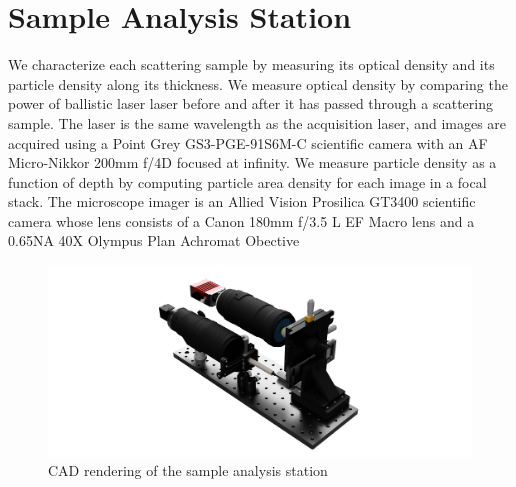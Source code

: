 \section{Sample Analysis Station}
We characterize each scattering sample by measuring its optical density and its particle density along its thickness. We measure optical density by comparing the power of ballistic laser laser before and after it has passed through a scattering sample. The laser is the same wavelength as the acquisition laser, and images are acquired using a Point Grey GS3-PGE-91S6M-C scientific camera with an AF Micro-Nikkor 200mm f/4D focused at infinity. We measure particle density as a function of depth by computing particle area density for each image in a focal stack. The microscope imager is an Allied Vision Prosilica GT3400 scientific camera whose lens consists of a Canon 180mm f/3.5 L EF Macro lens and a 0.65NA 40X Olympus Plan Achromat Obective
\begin{figure}
    \centering
    \includegraphics[width=\linewidth]{../figures/SampleAnalysisStation.png}
    \caption{CAD rendering of the sample analysis station}
    \label{fig:sample_analysis_station}
\end{figure}